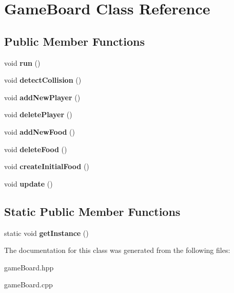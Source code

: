 \hypertarget{classGameBoard}{}\section{Game\+Board Class Reference}
\label{classGameBoard}
\subsection*{Public Member Functions}
\begin{DoxyCompactItemize}
\item 
void {\bfseries run} ()\hypertarget{classGameBoard_a9333dcacc4d45c25b0ee45ba0e48ac05}{}\label{classGameBoard_a9333dcacc4d45c25b0ee45ba0e48ac05}

\item 
void {\bfseries detect\+Collision} ()\hypertarget{classGameBoard_ae7f5e99ff3dfdaa9e7270fd4ac15fc61}{}\label{classGameBoard_ae7f5e99ff3dfdaa9e7270fd4ac15fc61}

\item 
void {\bfseries add\+New\+Player} ()\hypertarget{classGameBoard_ab6d586c018f78ef4128fb495bc4b6051}{}\label{classGameBoard_ab6d586c018f78ef4128fb495bc4b6051}

\item 
void {\bfseries delete\+Player} ()\hypertarget{classGameBoard_a3d710da0c96e2c1ffb9e63d8b896d16b}{}\label{classGameBoard_a3d710da0c96e2c1ffb9e63d8b896d16b}

\item 
void {\bfseries add\+New\+Food} ()\hypertarget{classGameBoard_ae2d6446a9ec3508e2259184d75da035c}{}\label{classGameBoard_ae2d6446a9ec3508e2259184d75da035c}

\item 
void {\bfseries delete\+Food} ()\hypertarget{classGameBoard_a5bdf02b93303dcf7a1415ee4a340cd48}{}\label{classGameBoard_a5bdf02b93303dcf7a1415ee4a340cd48}

\item 
void {\bfseries create\+Initial\+Food} ()\hypertarget{classGameBoard_a193c7dce603f0e6fde5d497a8fe5509a}{}\label{classGameBoard_a193c7dce603f0e6fde5d497a8fe5509a}

\item 
void {\bfseries update} ()\hypertarget{classGameBoard_a5dc2bdedeaa9d70bb4a1c35a5a257d91}{}\label{classGameBoard_a5dc2bdedeaa9d70bb4a1c35a5a257d91}

\end{DoxyCompactItemize}
\subsection*{Static Public Member Functions}
\begin{DoxyCompactItemize}
\item 
static void {\bfseries get\+Instance} ()\hypertarget{classGameBoard_a7ac1ba55db2c8d0fa666ac73ea3d2adb}{}\label{classGameBoard_a7ac1ba55db2c8d0fa666ac73ea3d2adb}

\end{DoxyCompactItemize}


The documentation for this class was generated from the following files\+:\begin{DoxyCompactItemize}
\item 
game\+Board.\+hpp\item 
game\+Board.\+cpp\end{DoxyCompactItemize}

